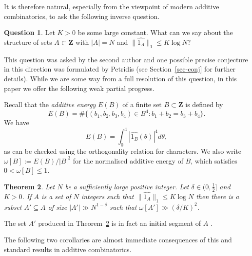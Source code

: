\documentclass[reqno]{amsart}
\newcommand{\anorm}[1]{\| \widehat{#1}\|}
\renewcommand{\leq}{\leqslant}
\newcommand{\ind}[1]{1_{#1}}
\newcommand{\bbz}{\mathbf{Z}}
\newcommand{\abs}[1]{\left\lvert #1\right\rvert}
\numberwithin{equation}{section}
\newtheorem{theorem}{Theorem}[section]
\theoremstyle{definition}
\newtheorem{question}[theorem]{Question}
\theoremstyle{remark}
\begin{document}
It is therefore natural, especially from the viewpoint of modern additive combinatorics, to ask the following inverse question.
\begin{question}
Let $K>0$ be some large constant. What can we say about the structure of sets $A\subset \bbz$ with $\abs{A}=N$ and $\anorm{\ind{A}}_1\leq K\log N$?
\end{question}
This question was asked by the second author \cite{Gr14} and one possible precise conjecture in this direction was formulated by Petridis \cite[Question 5.1]{Pe13} (see Section~\ref{sec-conj} for further details). While we are some way from a full resolution of this question, in this paper we offer the following weak partial progress.

Recall that the \emph{additive energy} $E(B)$ of a finite set $B \subset \bbz$ is defined by
\begin{equation}\label{add-energy-def} E(B) = \# \{ (b_1, b_2, b_3, b_4) \in B^4 : b_1 + b_2 = b_3 + b_4\}.\end{equation}
We have
\begin{equation}\label{energy-fourier} E(B) = \int^1_0 |\widehat{1_B}(\theta)|^4 d\theta,\end{equation} as can be checked using the orthogonality relation for characters. We also write $\omega[B] := E(B)/|B|^3$ for the normalised additive energy of $B$, which satisfies $0 < \omega[B] \leq 1$.


\begin{theorem}\label{th-struc}
Let $N$ be a sufficiently large positive integer. Let $\delta \in (0, \frac{1}{2}]$ and $K> 0$. If $A$ is a set of $N$ integers such that $\anorm{\ind{A}}_1\leq K\log N$ then there is a subset $A'\subseteq A$ of size $\abs{A'}\gg N^{1-\delta}$ such that $\omega[A']\gg (\delta/K)^{2}$.
\end{theorem}
The set $A'$ produced in Theorem~\ref{th-struc} is in fact an initial segment of $A$ .

The following two corollaries are almost immediate consequences of this and standard results in additive combinatorics.
\end{document}
